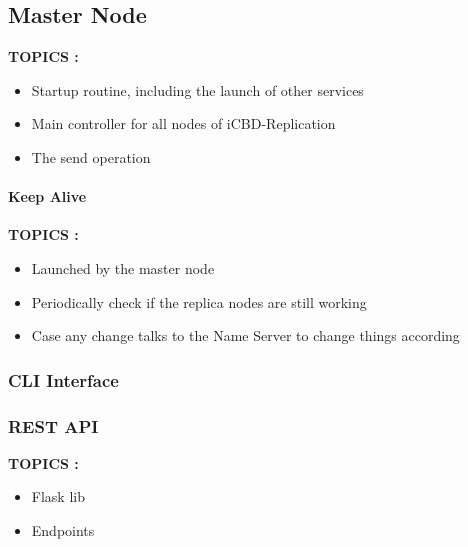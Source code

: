


\subsection{Master Node}
\label{sub:rep_master_node}

\textbf{TOPICS :}
\begin{itemize}
	\item Startup routine, including the launch of other services
	\item Main controller for all nodes of iCBD-Replication
	\item The send operation 
\end{itemize}

\paragraph{Keep Alive}
\label{par:rep_keep_alive}

\textbf{TOPICS :}
\begin{itemize}
	\item Launched by the master node
	\item Periodically check if the replica nodes are still working
	\item Case any change talks to the Name Server to change things according
\end{itemize}

\subsubsection{CLI Interface}
\label{subsub:rep_cli_interface}


\subsubsection{REST API}
\label{subsub:rep_restapi}
\textbf{TOPICS :}
\begin{itemize}
	\item Flask lib
	\item Endpoints
\end{itemize}


